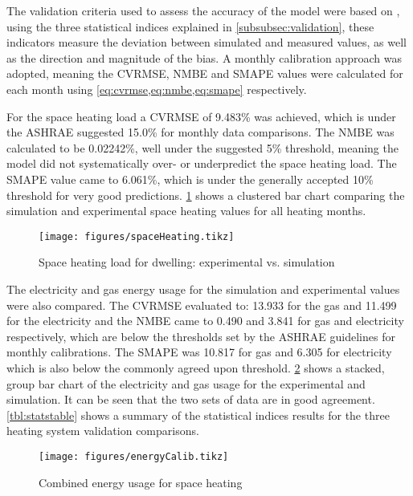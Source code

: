 The validation criteria used to assess the accuracy of the model were based on   \cite{ashrae_guideline_project_committee_14_ashrae_2014}, using the three statistical indices explained in \cref{subsubsec:validation}, these indicators measure the deviation between simulated and measured values, as well as the direction and magnitude of the bias. A monthly calibration approach was adopted, meaning the \ac{CVRMSE}, \ac{NMBE} and \ac{SMAPE} values were calculated for each month using \cref{eq:cvrmse,eq:nmbe,eq:smape} respectively. 

For the space heating load a \ac{CVRMSE} of 9.483\% was achieved, which is under the ASHRAE suggested 15.0\% for monthly data comparisons. The \ac{NMBE} was calculated to be 0.02242\%, well under the suggested 5\%  threshold, meaning the model did not systematically over- or underpredict the space heating load. The \ac{SMAPE} value came to 6.061\%, which is under the generally accepted 10\% threshold for very good predictions. \cref{fig:spaceheatingcalib} shows a clustered bar chart comparing the simulation and experimental space heating values for all heating months. 

\begin{figure}[htb]
    \centering
    \texttt{[image: figures/spaceHeating.tikz]}
    \caption{Space heating load for dwelling: experimental vs. simulation}
    \label{fig:spaceheatingcalib}
\end{figure}


The electricity and gas energy usage for the simulation and experimental values were also compared. The \ac{CVRMSE} evaluated to: \num{13.933} for the gas and \num{11.499} for the electricity and the \ac{NMBE} came to \num{0.490} and \num{3.841} for gas and electricity respectively, which are below the thresholds set by the ASHRAE guidelines for monthly calibrations. The \ac{SMAPE} was \num{10.817} for gas and \num{6.305} for electricity which is also below the commonly agreed upon threshold. \cref{fig:energycalib} shows a stacked, group bar chart of the electricity and gas usage for the experimental and simulation. It can be seen that the two sets of data are in good agreement. \cref{tbl:statstable} shows a summary of the statistical indices results for the three heating system validation comparisons.


\begin{figure}[htb]
    \centering
    \texttt{[image: figures/energyCalib.tikz]}
    \caption{Combined energy usage for space heating}
    \label{fig:energycalib}
\end{figure}

